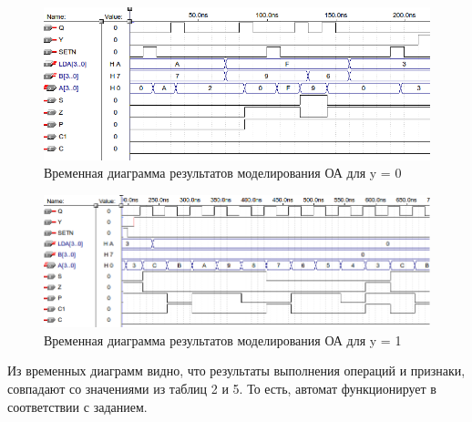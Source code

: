 \begin{figure}[H]
	\includegraphics[scale=0.5]{images/altera/rev2/final_test_log.png}
	\caption{Временная диаграмма результатов моделирования ОА для y = 0}
	\label{figure:oafin0test}
\end{figure}

\begin{figure}[H]
	\includegraphics[scale=0.5]{images/altera/rev2/final_test_ar.png}
	\caption{Временная диаграмма результатов моделирования ОА для y = 1}
	\label{figure:oafin1test}
\end{figure}

Из временных диаграмм видно, что результаты выполнения операций и признаки, совпадают со значениями из таблиц 2 и 5. То есть, автомат функционирует в соответствии с заданием.
